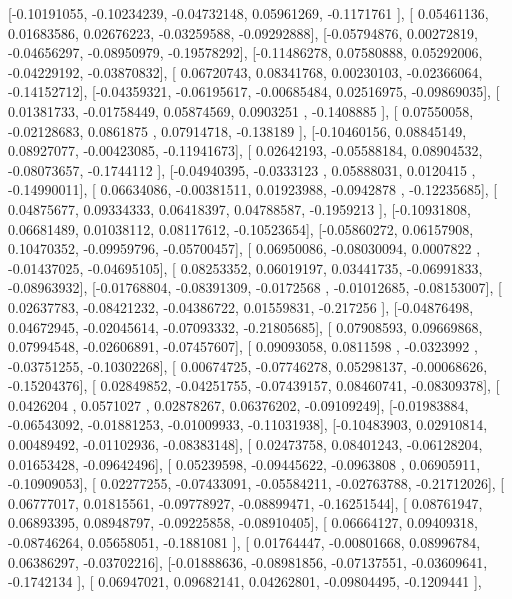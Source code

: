 \documentclass{article}
\begin{document}
       [-0.10191055, -0.10234239, -0.04732148,  0.05961269, -0.1171761 ],
       [ 0.05461136,  0.01683586,  0.02676223, -0.03259588, -0.09292888],
       [-0.05794876,  0.00272819, -0.04656297, -0.08950979, -0.19578292],
       [-0.11486278,  0.07580888,  0.05292006, -0.04229192, -0.03870832],
       [ 0.06720743,  0.08341768,  0.00230103, -0.02366064, -0.14152712],
       [-0.04359321, -0.06195617, -0.00685484,  0.02516975, -0.09869035],
       [ 0.01381733, -0.01758449,  0.05874569,  0.0903251 , -0.1408885 ],
       [ 0.07550058, -0.02128683,  0.0861875 ,  0.07914718, -0.138189  ],
       [-0.10460156,  0.08845149,  0.08927077, -0.00423085, -0.11941673],
       [ 0.02642193, -0.05588184,  0.08904532, -0.08073657, -0.1744112 ],
       [-0.04940395, -0.0333123 ,  0.05888031,  0.0120415 , -0.14990011],
       [ 0.06634086, -0.00381511,  0.01923988, -0.0942878 , -0.12235685],
       [ 0.04875677,  0.09334333,  0.06418397,  0.04788587, -0.1959213 ],
       [-0.10931808,  0.06681489,  0.01038112,  0.08117612, -0.10523654],
       [-0.05860272,  0.06157908,  0.10470352, -0.09959796, -0.05700457],
       [ 0.06950086, -0.08030094,  0.0007822 , -0.01437025, -0.04695105],
       [ 0.08253352,  0.06019197,  0.03441735, -0.06991833, -0.08963932],
       [-0.01768804, -0.08391309, -0.0172568 , -0.01012685, -0.08153007],
       [ 0.02637783, -0.08421232, -0.04386722,  0.01559831, -0.217256  ],
       [-0.04876498,  0.04672945, -0.02045614, -0.07093332, -0.21805685],
       [ 0.07908593,  0.09669868,  0.07994548, -0.02606891, -0.07457607],
       [ 0.09093058,  0.0811598 , -0.0323992 , -0.03751255, -0.10302268],
       [ 0.00674725, -0.07746278,  0.05298137, -0.00068626, -0.15204376],
       [ 0.02849852, -0.04251755, -0.07439157,  0.08460741, -0.08309378],
       [ 0.0426204 ,  0.0571027 ,  0.02878267,  0.06376202, -0.09109249],
       [-0.01983884, -0.06543092, -0.01881253, -0.01009933, -0.11031938],
       [-0.10483903,  0.02910814,  0.00489492, -0.01102936, -0.08383148],
       [ 0.02473758,  0.08401243, -0.06128204,  0.01653428, -0.09642496],
       [ 0.05239598, -0.09445622, -0.0963808 ,  0.06905911, -0.10909053],
       [ 0.02277255, -0.07433091, -0.05584211, -0.02763788, -0.21712026],
       [ 0.06777017,  0.01815561, -0.09778927, -0.08899471, -0.16251544],
       [ 0.08761947,  0.06893395,  0.08948797, -0.09225858, -0.08910405],
       [ 0.06664127,  0.09409318, -0.08746264,  0.05658051, -0.1881081 ],
       [ 0.01764447, -0.00801668,  0.08996784,  0.06386297, -0.03702216],
       [-0.01888636, -0.08981856, -0.07137551, -0.03609641, -0.1742134 ],
       [ 0.06947021,  0.09682141,  0.04262801, -0.09804495, -0.1209441 ],
\end{document}
